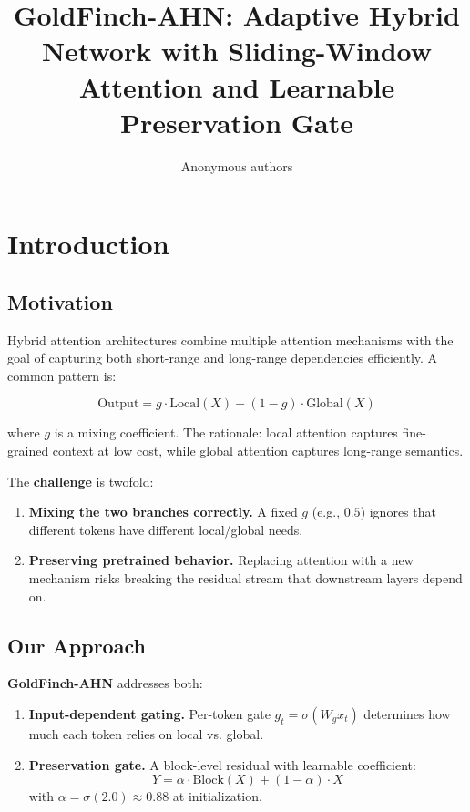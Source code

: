 \title{\textbf{GoldFinch-AHN: Adaptive Hybrid Network with Sliding-Window Attention and Learnable Preservation Gate}}

\author{Anonymous authors}



\section{Introduction}

\subsection{Motivation}

Hybrid attention architectures combine multiple attention mechanisms with 
the goal of capturing both short-range and long-range dependencies 
efficiently. A common pattern is:

\[
\text{Output} = g \cdot \text{Local}(X) + (1 - g) \cdot \text{Global}(X)
\tag{1.1}
\]

where $g$ is a mixing coefficient. The rationale: local attention captures 
fine-grained context at low cost, while global attention captures long-range 
semantics.

The \textbf{challenge} is twofold:

\begin{enumerate}
\item \textbf{Mixing the two branches correctly.} A fixed $g$ (e.g., $0.5$) ignores
  that different tokens have different local/global needs.
\item \textbf{Preserving pretrained behavior.} Replacing attention with a new
  mechanism risks breaking the residual stream that downstream layers
  depend on.

\end{enumerate}
\subsection{Our Approach}

\textbf{GoldFinch-AHN} addresses both:

\begin{enumerate}
\item \textbf{Input-dependent gating.} Per-token gate $g_t = \sigma(W_g x_t)$
  determines how much each token relies on local vs. global.
\item \textbf{Preservation gate.} A block-level residual with learnable coefficient:
  $$
  Y = \alpha \cdot \text{Block}(X) + (1 - \alpha) \cdot X
  \tag{1.2}
  $$
  with $\alpha = \sigma(2.0) \approx 0.88$ at initialization.

\end{enumerate}
